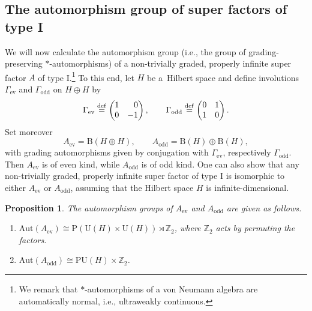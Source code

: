 \documentclass[pdftex]{sigma}
\numberwithin{equation}{section}
\newtheorem{Proposition}[Theorem]{Proposition}
\newcommand{\Z}{\mathbb{Z}}
\newcommand{\B}{\mathrm{B}}
\newcommand{\Aut}{\mathrm{Aut}}
\newcommand{\U}{\mathrm{U}}
\begin{document}
\subsection{The automorphism group of super factors of type I}

We will now calculate the automorphism group (i.e., the group of grading-preserving $*$-automor\-phisms) of a non-trivially graded, properly infinite super factor $A$ of type I.\footnote{We remark that $*$-automorphisms of a von Neumann algebra are automatically normal, i.e., ultraweakly continuous.}
To this end, let $H$ be a~Hilbert space and define involutions $\Gamma_{\mathrm{ev}}$ and $\Gamma_{\mathrm{odd}}$ on $H\oplus H$ by
\begin{equation} \label{GammaMatrices}
\Gamma_{\mathrm{ev}}  \stackrel{\mathrm{def}}{=}  \begin{pmatrix} 1 & \hphantom{-}0 \\ 0 & -1 \end{pmatrix}, \qquad
\Gamma_{\mathrm{odd}}  \stackrel{\mathrm{def}}{=}  \begin{pmatrix} 0 & 1 \\ 1 & 0 \end{pmatrix}.
\end{equation}
Set moreover
\begin{equation*}
 A_{\mathrm{ev}} = \B(H \oplus H), \qquad A_{\mathrm{odd}} = \B(H) \oplus \B(H),
\end{equation*}
with grading automorphisms given by conjugation with $\Gamma_{\mathrm{ev}}$, respectively $\Gamma_{\mathrm{odd}}$.
Then $A_{\mathrm{ev}}$ is of even kind, while $A_{\mathrm{odd}}$ is of odd kind.
One can also show that any non-trivially graded, properly infinite super factor of type I is isomorphic to either $A_{\mathrm{ev}}$ or $A_{\mathrm{odd}}$, assuming that the Hilbert space $H$ is infinite-dimensional.

\begin{Proposition} \label{PropositionAutomorphismGroups}
The automorphism groups of $A_{\mathrm{ev}}$ and $A_{\mathrm{odd}}$ are given as follows.
\begin{enumerate}\itemsep=0pt
\item[$(i)$] $\Aut(A_{\mathrm{ev}}) \cong \mathrm{P}(\U(H) \times \U(H)) \rtimes \Z_2$, where $\Z_2$ acts by permuting the factors.
\item[$(ii)$] $\Aut(A_{\mathrm{odd}}) \cong \mathrm{PU}(H) \times \Z_2$.
\end{enumerate}
\end{Proposition}
\end{document}
